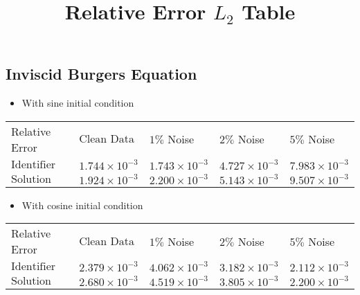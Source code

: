 \documentclass[12pt]{article}
\begin{document}
\title{Relative Error $L_{2}$ Table}
\author{}
\date{}

\maketitle




\subsection{Inviscid Burgers Equation}

\begin{itemize}
    \item With sine initial condition 
\end{itemize}
	\tabulinesep=4mm
	{ \large  }
	\vspace{3mm}
	\begin{tabu} to \linewidth { | X[c] | X[c] | X[c] | X[c] | X[c] | }
		 \hline
		\everyrow{\hline}
		Relative Error	& $\text{Clean Data}$ & $1 \%$ Noise & $2 \%$ Noise & $5 \%$ Noise \\
		$\text{Identifier}$ & $1.744 \times 10^{-3}$  & $1.743 \times 10^{-3}$   & $4.727 \times 10^{-3}$  & $7.983 \times 10^{-3}$ \\
		$\text{Solution}$ & $1.924 \times 10^{-3}$ &  $2.200 \times 10^{-3}$ & $5.143 \times 10^{-3}$    &  $9.507 \times 10^{-3}$  \\
	\end{tabu}


\begin{itemize}
    \item With cosine initial condition 
\end{itemize}
	\tabulinesep=4mm
	{ \large  }
	\vspace{3mm}
	\begin{tabu} to \linewidth { | X[c] | X[c] | X[c] | X[c] | X[c] | }
		 \hline
		\everyrow{\hline}
		Relative Error	& $\text{Clean Data}$ & $1 \%$ Noise & $2 \%$ Noise & $5 \%$ Noise \\
		$\text{Identifier}$ & $2.379 \times 10^{-3}$  & $4.062 \times 10^{-3}$   & $3.182 \times 10^{-3}$  & $2.112 \times 10^{-3}$ \\
		$\text{Solution}$ & $2.680 \times 10^{-3}$ &  $4.519 \times 10^{-3}$ & $3.805 \times 10^{-3}$    &  $2.200 \times 10^{-3}$  \\
	\end{tabu}
\end{document}
